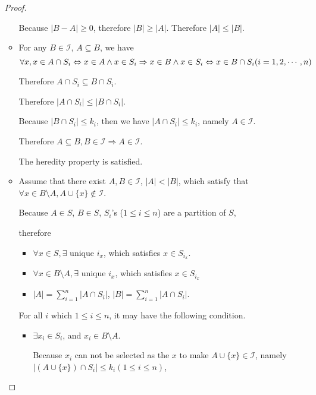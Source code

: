 \documentclass[12pt,a4paper]{article}
\theoremstyle{definition}
\begin{document}
\begin{enumerate}
\begin{proof}
\begin{itemize}
    		        Because $|B-A|\ge 0$, therefore $|B|\ge |A|$. Therefore $|A| \le |B|$.    
    	    \item 
    	        For any $B \in \mathcal{I}$, $A \subseteq B$, we have 
    	        \begin{equation*}
    	            \forall x, x \in A\cap S_i \Leftrightarrow x \in A \wedge x \in S_i\\
    	            \Rightarrow x \in B \wedge  x \in S_i \Leftrightarrow x \in B\cap S_i(i=1,2,\cdots,n)
    	        \end{equation*}
    	        
    	        Therefore $A\cap S_i \subseteq B\cap S_i$.
    	        
    	        Therefore $|A\cap S_i|\le|B\cap S_i|$.
    	        
    	        Because $|B\cap S_i|\le k_i$, then we have $|A\cap S_i|\le k_i$, namely $A\in \mathcal{I}$.
    	        
    	        Therefore $A\subseteq B,B \in \mathcal{I} \Rightarrow A\in \mathcal{I}$.
    	        
    	        The heredity property is satisfied.
    	    \item 
    	       Assume that there exist $A,B\in \mathcal{I}$, $|A|<|B|$, which satisfy that $\forall x \in B\setminus A,A\cup \{x\} \notin \mathcal{I}$.
    	       
    	       Because $A\in S$, $B\in S$, $S_i$'s ($1\le i \le n$) are a partition of $S$,
    	       
    	       therefore 
    	       \begin{itemize}
    	       	\item  $\forall x \in S, \exists$ unique $i_x$, which satisfies $x\in S_{i_x}$.
    	       	\item  $\forall x \in B \setminus A, \exists$ unique $i_x$, which satisfies $x\in S_{i_x}$
    	       	\item  $|A|=\sum_{i=1}^{n} |A\cap S_i|$, $|B|=\sum_{i=1}^{n} |A\cap S_i|$.
    	       \end{itemize}     
               For all $i$ which $1\le i \le n$, it may have the following condition.
               \begin{itemize}
               	\item 
               	    $\exists x_i \in S_i$, and $x_i\in B \setminus A$.
               	    
               	    Because $x_i$ can not be selected as the $x$ to make $A\cup\{x\}\in \mathcal{I}$, namely $|(A\cup\{x\})\cap S_i|\le k_i(1\le i\le n)$,
               	    

\end{itemize}
\end{itemize}
\end{proof}
\end{enumerate}
\end{document}
